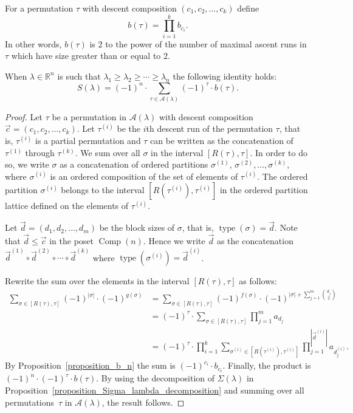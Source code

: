 \documentclass[ALCO,ThmDefs,Unicode,epreuves]{cedram}
\newcommand{\Rrr}{\mathbb{R}}
\DeclareMathOperator{\Comp}{Comp}
\DeclareMathOperator{\type}{type}
\newcommand{\lambdaweaklydecreasing}
{\lambda_{1} \geq \lambda_{2} \geq \cdots \geq \lambda_{n}}
\begin{document}
For a permutation $\tau$ with
descent composition
$(c_{1}, c_{2}, \ldots, c_{k})$
define
$$  b(\tau) = \prod_{i=1}^{k} b_{c_{i}} .  $$
In other words, $b(\tau)$ is $2$ to the power of the number of maximal
ascent runs in $\tau$ which have size greater than or equal to $2$.
\begin{theorem}
When $\lambda\in\Rrr^n$ is such that 
$\lambdaweaklydecreasing$
the following identity holds:
$$
S(\lambda)
=
(-1)^{n}
\cdot 
\sum_{\tau \in \mathcal{A}(\lambda)} (-1)^{\tau} \cdot b(\tau)  .
$$
\end{theorem}
\begin{proof}
Let $\tau$ be a permutation in $\mathcal{A}(\lambda)$
with descent composition $\vec{c} = (c_{1}, c_{2}, \ldots, c_{k})$.
Let $\tau^{(i)}$ be the $i$th descent run of the permutation $\tau$,
that is, $\tau^{(i)}$ is a partial permutation
and
$\tau$ can be written as the concatenation
of $\tau^{(1)}$ through $\tau^{(k)}$.
We sum over all $\sigma$ in the interval
$[R(\tau),\tau]$.
In order to do so, we write $\sigma$ as a concatenation
of ordered partitions
$\sigma^{(1)}$, 
$\sigma^{(2)}, \ldots,
\sigma^{(k)}$,
where
$\sigma^{(i)}$
is an ordered composition of the set of elements of $\tau^{(i)}$.
The ordered partition $\sigma^{(i)}$ belongs to the interval
$[R(\tau^{(i)}),\tau^{(i)}]$ in the ordered partition lattice defined
on the elements of $\tau^{(i)}$.

Let $\vec{d} = (d_{1}, d_{2}, \ldots, d_{m})$ be the block sizes of $\sigma$,
that is, $\type(\sigma) = \vec{d}$.
Note that $\vec{d} \leq \vec{c}$ in the poset $\Comp(n)$.
Hence we write
$\vec{d}$
as the concatenation
$\vec{d}^{(1)} \circ \vec{d}^{(2)} \circ \cdots  \circ \vec{d}^{(k)}$
where $\type(\sigma^{(i)}) = \vec{d}^{(i)}$.

Rewrite the sum over the elements in the interval
$[R(\tau),\tau]$ as follows:
\begin{align*}
\sum_{\sigma \in [R(\tau),\tau]} (-1)^{|\sigma|} \cdot (-1)^{g(\sigma)}
& =
\sum_{\sigma \in [R(\tau),\tau]}
(-1)^{f(\sigma)} \cdot 
(-1)^{|\sigma| + \sum_{j=1}^{m} \binom{d_{j}}{2}} \\
& =
(-1)^{\tau} \cdot 
\sum_{\sigma \in [R(\tau),\tau]}
\prod_{j=1}^{m} a_{d_{j}} \\
& =
(-1)^{\tau} \cdot 
\prod_{i=1}^{k}
\sum_{\sigma^{(i)} \in [R(\tau^{(i)}),\tau^{(i)}]}
\prod_{j=1}^{|\vec{d}^{(i)}|}
a_{d^{(i)}_{j}}
.
\end{align*}
By Proposition~\ref{proposition_b_n}
the sum is $(-1)^{c_{i}} \cdot b_{c_{i}}$.
Finally, the product is
$(-1)^{n} \cdot (-1)^{\tau} \cdot b(\tau)$.
By using
the decomposition of $\Sigma(\lambda)$ in
Proposition~\ref{proposition_Sigma_lambda_decomposition}
and
summing over all permutations~$\tau$ in $\mathcal{A}(\lambda)$,
the result follows.
\end{proof}
\end{document}

